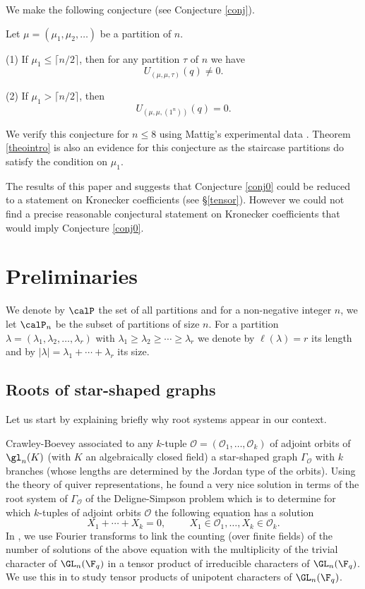 We make the following conjecture (see Conjecture \ref{conj}).

\begin{conj} Let $\mu=(\mu_1,\mu_2,\dots)$ be a partition of $n$. 
	
	(1) If $\mu_1\leq \lceil n/2\rceil$, then for any partition $\tau$ of $n$ we have
	$$
	U_{(\mu,\mu,\tau)}(q)\neq 0.
	$$
	
	(2) If $\mu_1>\lceil n/2\rceil$, then 
	$$
	U_{(\mu,\mu,(1^n))}(q)= 0.
	$$
	\label{conj0}\end{conj}

We verify this conjecture for $n\leq 8$ using Mattig's experimental data \cite{Lu}.  Theorem \ref{theointro} is also an evidence for this conjecture as the staircase partitions do satisfy the condition on $\mu_1$. 


The results  of this paper and \cite{L1} suggests that Conjecture \ref{conj0} could be reduced to a statement on Kronecker coefficients (see \S\ref{tensor}). However we could not find a precise reasonable conjectural statement on Kronecker coefficients  that would imply Conjecture \ref{conj0}.

 


\section{Preliminaries}

We denote by $\calP$ the set of all partitions and for a non-negative integer $n$, we let $\calP_n$ be the subset of partitions of size $n$. For a partition $\lambda=(\lambda_1,\lambda_2,\dots,\lambda_r)$ with $\lambda_1\geq\lambda_2\geq\cdots\geq\lambda_r$ we denote by $\ell(\lambda)=r$ its length and by $|\lambda|=\lambda_1+\cdots+\lambda_r$ its size.

\subsection{Roots of star-shaped graphs}\label{ss:roots}

Let us start by explaining briefly why root systems appear in our context.


Crawley-Boevey \cite{CB} associated to any $k$-tuple $\mathcal{O}=(\mathcal{O}_1,\dots,\mathcal{O}_k)$ of adjoint orbits of $\gl_n(K)$ (with $K$ an algebraically closed field) a star-shaped graph $\Gamma_{\mathcal{O}}$ with $k$ branches (whose lengths are determined by the Jordan type of the orbits). Using the theory of quiver representations, he found a very nice solution in terms of the root system of $\Gamma_{\mathcal{O}}$ of the Deligne-Simpson problem which is to determine for which $k$-tuples of adjoint orbits $\mathcal{O}$ the following equation has a solution
$$
X_1+\cdots+X_k=0,\hspace{1cm}X_1\in\mathcal{O}_1,\dots, X_k\in\mathcal{O}_k.
$$
In \cite{hausel-letellier-villegas2}, we use Fourier transforms to link the counting (over finite fields) of the number of solutions of the above equation with the multiplicity of the trivial character of $\GL_n(\F_q)$ in a tensor product of irreducible characters of $\GL_n(\F_q)$. We use this in \cite{L1} to study tensor products of unipotent characters of $\GL_n(\F_q)$.


